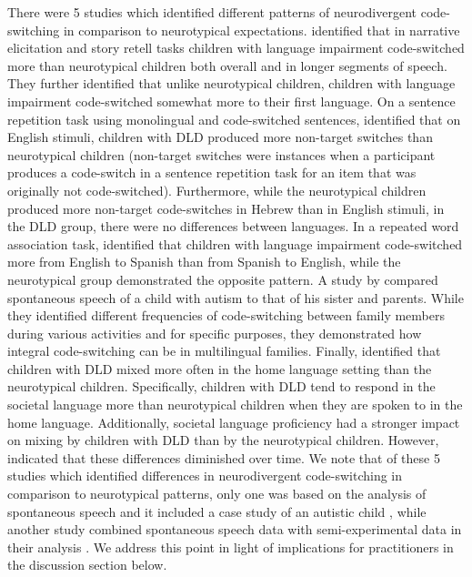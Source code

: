 \documentclass[output=paper]{langscibook}
\begin{document}
There were 5 studies which identified different patterns of neurodivergent code-switching in comparison to neurotypical expectations. \citet{Iluz-CohenWalters2012} identified that in narrative elicitation and story retell tasks children with language impairment code-switched more than neurotypical children both overall and in longer segments of speech. They further identified that unlike neurotypical children, children with language impairment code-switched somewhat more to their first language. On a sentence repetition task using monolingual and code-switched sentences, \citet{SoesmanEtAl2022} identified that on English stimuli, children with DLD produced more non-target switches than neurotypical children (non-target switches were instances when a participant produces a code-switch in a sentence repetition task for an item that was originally not code-switched). Furthermore, while the neurotypical children produced more non-target code-switches in Hebrew than in English stimuli, in the DLD group, there were no differences between languages. In a repeated word association task, \citet{ShengEtAl2012} identified that children with language impairment code-switched more from English to Spanish than from Spanish to English, while the neurotypical group demonstrated the opposite pattern. A study by \citet{CohenEtAl2025} compared spontaneous speech of a child with autism to that of his sister and parents. While they identified different frequencies of code-switching between family members during various activities and for specific purposes, they demonstrated how integral code-switching can be in multilingual families. Finally, \citet{BlomEtAl2024} identified that children with DLD mixed more often in the home language setting than the neurotypical children. Specifically, children with DLD tend to respond in the societal language more than neurotypical children when they are spoken to in the home language. Additionally, societal language proficiency had a stronger impact on mixing by children with DLD than by the neurotypical children. However, \citet{BlomEtAl2024} indicated that these differences diminished over time. We note that of these 5 studies which identified differences in neurodivergent code-switching in comparison to neurotypical patterns, only one was based on the analysis of spontaneous speech and it included a case study of an autistic child \citep{CohenEtAl2025}, while another study combined spontaneous speech data with semi-experimental data in their analysis \citep{BlomEtAl2024}. We address this point in light of implications for practitioners in the discussion section below.
\end{document}
